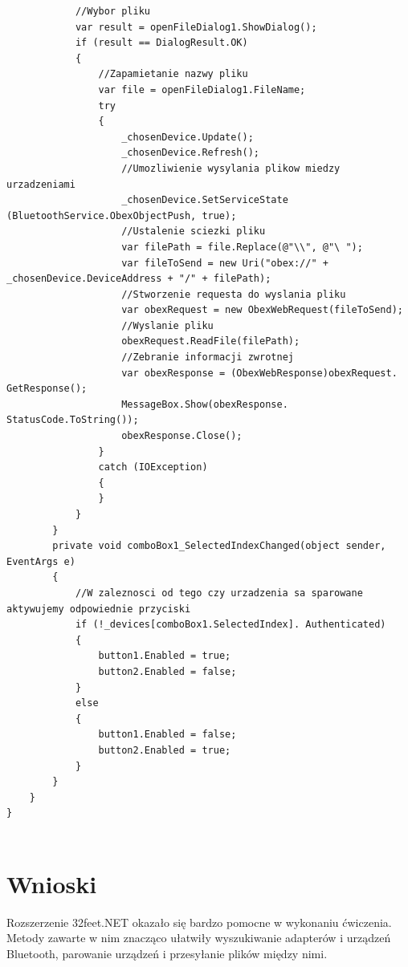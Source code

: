 \documentclass[12pt,a4paper,notitlepage]{report}
\begin{document}
\begin{adjustwidth}{0pt}{-50pt}
\begin{lstlisting}
            //Wybor pliku
            var result = openFileDialog1.ShowDialog();
            if (result == DialogResult.OK)
            {
                //Zapamietanie nazwy pliku
                var file = openFileDialog1.FileName;
                try
                {
                    _chosenDevice.Update();
                    _chosenDevice.Refresh();
                    //Umozliwienie wysylania plikow miedzy urzadzeniami
                    _chosenDevice.SetServiceState (BluetoothService.ObexObjectPush, true);
                    //Ustalenie sciezki pliku
                    var filePath = file.Replace(@"\\", @"\ ");
                    var fileToSend = new Uri("obex://" + _chosenDevice.DeviceAddress + "/" + filePath);
                    //Stworzenie requesta do wyslania pliku
                    var obexRequest = new ObexWebRequest(fileToSend);
                    //Wyslanie pliku
                    obexRequest.ReadFile(filePath);
                    //Zebranie informacji zwrotnej
                    var obexResponse = (ObexWebResponse)obexRequest. GetResponse();
                    MessageBox.Show(obexResponse. StatusCode.ToString());
                    obexResponse.Close();
                }
                catch (IOException)
                {
                }
            }
        }
        private void comboBox1_SelectedIndexChanged(object sender, EventArgs e)
        {
            //W zaleznosci od tego czy urzadzenia sa sparowane aktywujemy odpowiednie przyciski
            if (!_devices[comboBox1.SelectedIndex]. Authenticated)
            {
                button1.Enabled = true;
                button2.Enabled = false;
            }
            else
            {
                button1.Enabled = false;
                button2.Enabled = true;
            }
        }
    }
}


\end{lstlisting}
\end{adjustwidth}
\section{Wnioski}
Rozszerzenie 32feet.NET okazało się bardzo pomocne w wykonaniu ćwiczenia. Metody zawarte w nim znacząco ułatwiły wyszukiwanie adapterów i urządzeń Bluetooth, parowanie urządzeń i przesyłanie plików między nimi.
\end{document}
